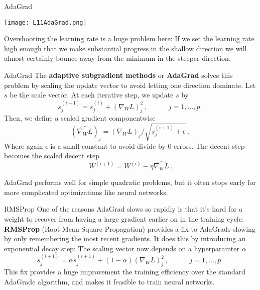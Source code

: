 \documentclass[10pt, table, dvipsnames,xcdraw,handout]{beamer}
\begin{document}
\begin{frame}[fragile]{AdaGrad}
  \begin{minipage}[t][0.5\textheight][t]{\textwidth}
	\centering \texttt{[image: L11AdaGrad.png]} 
  \end{minipage}
  \vfill
\begin{minipage}[t][0.5\textheight][t]{\textwidth}
Overshooting the learning rate is a huge problem here: If we set the learning rate high enough that we make substantial progress in the shallow direction we will almost certainly bounce away from the minimum in the steeper direction. 
\end{minipage}
\end{frame}


\begin{frame}[fragile]{AdaGrad}
The \textbf{adaptive subgradient methods} or \textbf{AdaGrad} solves this problem by scaling the update vector to avoid letting one direction dominate. Let $s$ be the scale vector. At each iterative step, we update $s$ by
$$
s_j^{(i+1)} = s_j^{(i)} + (\nabla_{W} L) _j^2\,,\hspace{3em} j=1,\ldots, p\,.
$$\pause
Then, we define a scaled gradient componentwise
$$
(\hat{\nabla_{W} L})_j = (\nabla_{W} L)_j/\sqrt{s_j^{(i+1)}+\epsilon} \,,
$$
Where again $\epsilon$ is a small constant to avoid divide by 0 errors.  \pause The decent step becomes the scaled decent step
$$
W^{(i+1)} = W^{(i)} - \eta \hat{\nabla_{W} L}\,.
$$\pause

AdaGrad performs well for simple quadratic problems, but it often stops early for more complicated optimizations like neural networks. 
\end{frame}



\begin{frame}[fragile]{RMSProp}
One of the reasons AdaGrad slows so rapidly is that it's hard for a weight to recover from having a large gradient earlier on in the training cycle.  \textbf{RMSProp} (Root Mean Square Propagation) provides a fix to AdaGrads slowing by only remembering the most recent gradients. It does this by introducing an exponential decay step: The scaling vector now depends on a hyperparamter $\alpha$
$$
s_j ^{(i+1)}= \alpha s_j^{(i+1)} + (1-\alpha) (\nabla_{W} L) _j^2\,,\hspace{3em} j=1,\ldots, p\,.
$$\pause
This fix provides a huge improvement the training efficiency over the standard AdaGrade algorithm, and makes it feasible to train neural networks. 

\end{frame}
\end{document}

